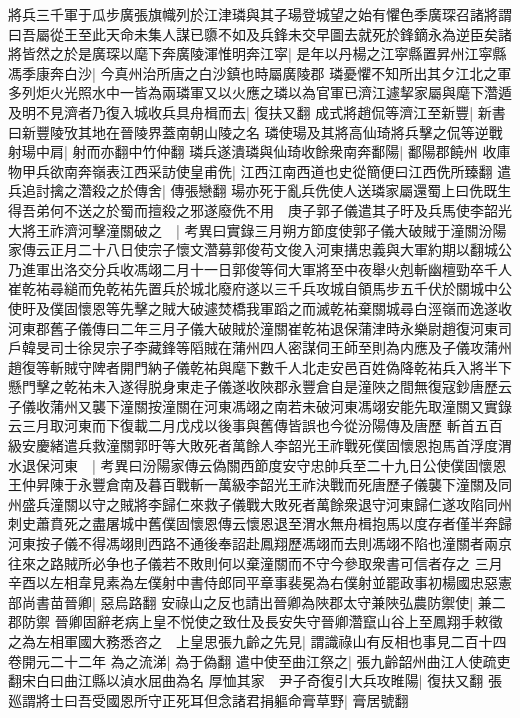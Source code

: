 將兵三千軍于瓜步廣張旗幟列於江津璘與其子瑒登城望之始有懼色季廣琛召諸將謂曰吾屬從王至此天命未集人謀已隳不如及兵鋒未交早圖去就死於鋒鏑永為逆臣矣諸將皆然之於是廣琛以麾下奔廣陵渾惟明奔江寜|{
	是年以丹楊之江寜縣置昇州江寜縣}
馮季康奔白沙|{
	今真州治所唐之白沙鎮也時屬廣陵郡}
璘憂懼不知所出其夕江北之軍多列炬火光照水中一皆為兩璘軍又以火應之璘以為官軍已濟江遽挈家屬與麾下濳遁及明不見濟者乃復入城收兵具舟楫而去|{
	復扶又翻}
成式將趙侃等濟江至新豐|{
	新書曰新豐陵攷其地在晉陵界蓋南朝山陵之名}
璘使瑒及其將高仙琦將兵擊之侃等逆戰射瑒中肩|{
	射而亦翻中竹仲翻}
璘兵遂潰璘與仙琦收餘衆南奔鄱陽|{
	鄱陽郡饒州}
收庫物甲兵欲南奔嶺表江西采訪使皇甫侁|{
	江西江南西道也史從簡便曰江西侁所臻翻}
遣兵追討擒之濳殺之於傳舍|{
	傳張戀翻}
瑒亦死于亂兵侁使人送璘家屬還蜀上曰侁既生得吾弟何不送之於蜀而擅殺之邪遂廢侁不用　庚子郭子儀遣其子旴及兵馬使李韶光大將王祚濟河擊潼關破之　|{
	考異曰實錄三月朔方節度使郭子儀大破賊于潼關汾陽家傳云正月二十八日使宗子懷文濳募郭俊苟文俊入河東搆忠義與大軍約期以翻城公乃進軍出洛交分兵收馮翊二月十一日郭俊等伺大軍將至中夜舉火剋斬幽檀勁卒千人崔乾祐尋縋而免乾祐先置兵於城北廢府遂以三千兵攻城自領馬步五千伏於關城中公使旴及僕固懷恩等先擊之賊大破遽焚橋我軍蹈之而滅乾祐棄關城尋白涇嶺而逸遂收河東郡舊子儀傳曰二年三月子儀大破賊於潼關崔乾祐退保蒲津時永樂尉趙復河東司戶韓旻司士徐炅宗子李藏鋒等䧟賊在蒲州四人密謀伺王師至則為内應及子儀攻蒲州趙復等斬賊守陴者開門納子儀乾祐與麾下數千人北走安邑百姓偽降乾祐兵入將半下懸門擊之乾祐未入遂得脱身東走子儀遂收陜郡永豐倉自是潼陜之間無復寇鈔唐歷云子儀收蒲州又襲下潼關按潼關在河東馮翊之南若未破河東馮翊安能先取潼關又實錄云三月取河東而下復載二月戊戍以後事與舊傳皆誤也今從汾陽傳及唐歷}
斬首五百級安慶緒遣兵救潼關郭旴等大敗死者萬餘人李韶光王祚戰死僕固懷恩抱馬首浮度渭水退保河東　|{
	考異曰汾陽家傳云偽關西節度安守忠帥兵至二十九日公使僕固懷恩王仲昇陳于永豐倉南及暮百戰斬一萬級李韶光王祚決戰而死唐歷子儀襲下潼關及同州盛兵潼關以守之賊將李歸仁來救子儀戰大敗死者萬餘衆退守河東歸仁遂攻陷同州刺史蕭賁死之盡屠城中舊僕固懷恩傳云懷恩退至渭水無舟楫抱馬以度存者僅半奔歸河東按子儀不得馮翊則西路不通後奉詔赴鳳翔歷馮翊而去則馮翊不陷也潼關者兩京往來之路賊所必争也子儀若不敗則何以棄潼關而不守今參取衆書可信者存之}
三月辛酉以左相韋見素為左僕射中書侍郎同平章事裴冕為右僕射並罷政事初楊國忠惡憲部尚書苗晉卿|{
	惡烏路翻}
安祿山之反也請出晉卿為陜郡太守兼陜弘農防禦使|{
	兼二郡防禦}
晉卿固辭老病上皇不悦使之致仕及長安失守晉卿濳竄山谷上至鳳翔手敕徵之為左相軍國大務悉咨之　上皇思張九齡之先見|{
	謂識祿山有反相也事見二百十四卷開元二十二年}
為之流涕|{
	為于偽翻}
遣中使至曲江祭之|{
	張九齡韶州曲江人使疏吏翻宋白曰曲江縣以湞水屈曲為名}
厚恤其家　尹子奇復引大兵攻睢陽|{
	復扶又翻}
張廵謂將士曰吾受國恩所守正死耳但念諸君捐軀命膏草野|{
	膏居號翻}
